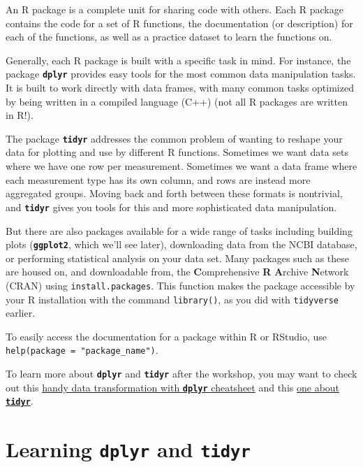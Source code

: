 \documentclass[]{book}
\begin{document}
An R package is a complete unit for sharing code with others. Each R
package contains the code for a set of R functions, the documentation
(or description) for each of the functions, as well as a practice
dataset to learn the functions on.

Generally, each R package is built with a specific task in mind. For
instance, the package \textbf{\texttt{dplyr}} provides easy tools for
the most common data manipulation tasks. It is built to work directly
with data frames, with many common tasks optimized by being written in a
compiled language (C++) (not all R packages are written in R!).

The package \textbf{\texttt{tidyr}} addresses the common problem of
wanting to reshape your data for plotting and use by different R
functions. Sometimes we want data sets where we have one row per
measurement. Sometimes we want a data frame where each measurement type
has its own column, and rows are instead more aggregated groups. Moving
back and forth between these formats is nontrivial, and
\textbf{\texttt{tidyr}} gives you tools for this and more sophisticated
data manipulation.

But there are also packages available for a wide range of tasks
including building plots (\textbf{\texttt{ggplot2}}, which we'll see
later), downloading data from the NCBI database, or performing
statistical analysis on your data set. Many packages such as these are
housed on, and downloadable from, the \textbf{C}omprehensive \textbf{R}
\textbf{A}rchive \textbf{N}etwork (CRAN) using
\texttt{install.packages}. This function makes the package accessible by
your R installation with the command \texttt{library()}, as you did with
\texttt{tidyverse} earlier.

To easily access the documentation for a package within R or RStudio,
use \texttt{help(package\ =\ "package\_name")}.

To learn more about \textbf{\texttt{dplyr}} and \textbf{\texttt{tidyr}}
after the workshop, you may want to check out this
\href{https://github.com/rstudio/cheatsheets/raw/master/data-transformation.pdf}{handy
data transformation with \textbf{\texttt{dplyr}} cheatsheet} and this
\href{https://github.com/rstudio/cheatsheets/raw/master/data-import.pdf}{one
about \textbf{\texttt{tidyr}}}.

\section{\texorpdfstring{Learning \textbf{\texttt{dplyr}} and
\textbf{\texttt{tidyr}}}{Learning dplyr and tidyr}}\label{learning-dplyr-and-tidyr}
\end{document}
